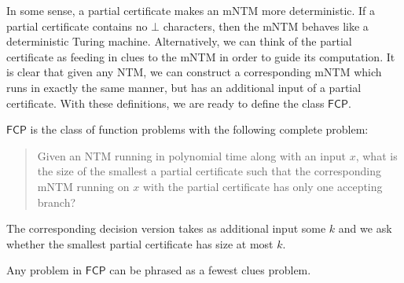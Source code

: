 \documentclass[runningheads,a4paper]{llncs}
\begin{document}
In some sense, a partial certificate makes an mNTM more deterministic. If a partial certificate contains no $\bot$ characters, then the mNTM behaves like a deterministic Turing machine. Alternatively, we can think of the partial certificate as feeding in clues to the mNTM in order to guide its computation. It is clear that given any NTM, we can construct a corresponding mNTM which runs in exactly the same manner, but has an additional input of a partial certificate. With these definitions, we are ready to define the class $\mathsf{FCP}$.

\begin{definition}
$\mathsf{FCP}$ is the class of function problems with the following complete problem:
\begin{quote}
Given an NTM running in polynomial time along with an input $x$, what is the size of the smallest a partial certificate such that the corresponding mNTM running on $x$ with the partial certificate has only one accepting branch?
\end{quote}
The corresponding decision version takes as additional input some $k$ and we ask whether the smallest partial certificate has size at most $k$.
\end{definition}

\begin{proposition}
Any problem in $\mathsf{FCP}$ can be phrased as a fewest clues problem.
\end{proposition}
\end{document}

